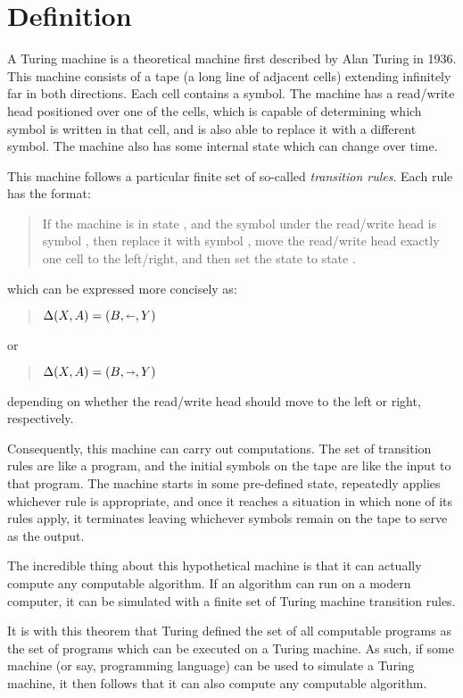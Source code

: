 \section{Definition}
A Turing machine is a theoretical machine first described by Alan Turing in 1936. This machine consists of a tape (a long line of adjacent cells) extending infinitely far in both directions. Each cell contains a symbol. The machine has a read/write head positioned over one of the cells, which is capable of determining which symbol is written in that cell, and is also able to replace it with a different symbol. The machine also has some internal state which can change over time.

This machine follows a particular finite set of so-called \textit{transition rules}. Each rule has the format:

\begin{quote}
    If the machine is in state , and the symbol under the read/write head is symbol , then replace it with symbol , move the read/write head exactly one cell to the left/right, and then set the state to state .
\end{quote}

which can be expressed more concisely as:

\begin{quote}
    $\Delta(X,A) = (B,\shortleftarrow,Y)$
\end{quote}
or
\begin{quote}
    $\Delta(X,A) = (B,\shortrightarrow,Y)$
\end{quote}
depending on whether the read/write head should move to the left or right, respectively.

Consequently, this machine can carry out computations. The set of transition rules are like a program, and the initial symbols on the tape are like the input to that program. The machine starts in some pre-defined state, repeatedly applies whichever rule is appropriate, and once it reaches a situation in which none of its rules apply, it terminates leaving whichever symbols remain on the tape to serve as the output.

The incredible thing about this hypothetical machine is that it can actually compute any computable algorithm. If an algorithm can run on a modern computer, it can be simulated with a finite set of Turing machine transition rules.

It is with this theorem that Turing defined the set of all computable programs as the set of programs which can be executed on a Turing machine. As such, if some machine (or say, programming language) can be used to simulate a Turing machine, it then follows that it can also compute any computable algorithm.

